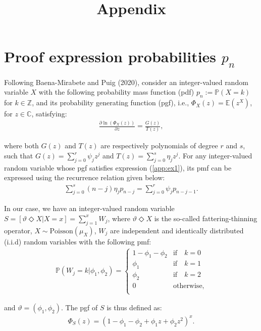 \documentclass{article}
\title{Appendix}
\date{}
\begin{document}
\maketitle

\section
{Proof expression probabilities $p_n$}

Following Baena-Mirabete and Puig (2020), consider an integer-valued random variable $X$ with the following probability mass function (pdf) $p_n:=\mathbb{P}(X=k)$ for $k \in \mathbb{Z}$, and its probability generating function (pgf), i.e., $\Phi_X(z)=\mathbb{E}(z^X)$, for $z\in \mathbb{C}$, satisfying:
\begin{align}\label{app:ex1}
\frac{\partial \ln(\Phi_X(z))}{\partial z}=\frac{G(z)}{T(z)},
\end{align}

where both $G(z)$ and $T(z)$ are respectively polynomials of degree $r$ and $s$, such that $G(z)=\sum_{j=0}^r \psi_j z^j$ and $T(z)=\sum_{j=0}^s \eta_j z^j$. For any integer-valued random variable whose pgf satisfies expression (\ref{app:ex1}), its pmf can be expressed using the recurrence relation given below:
\begin{align}\label{app:ex2}
\sum_{j=0}^s(n-j)\eta_jp_{n-j}=\sum_{j=0}^r \psi_j p_{n-j-1}.
\end{align}

In our case, we have an integer-valued random variable $S=[\vartheta\Diamond X|X=x]=\sum_{j=1}^xW_j$, where $\vartheta \Diamond X$ is the so-called fattering-thinning operator, $X \sim \textrm{Poisson}(\mu_X)$, $W_j$ are independent and identically distributed (i.i.d) random variables with the following pmf:
\begin{align}\label{app:ex3}
\mathbb{P}(W_j=k|\phi_1,\phi_2)=\begin{cases} 
1-\phi_1-\phi_2  & \textrm{if} \quad k=0 \\
\phi_1 & \textrm{if} \quad k=1 \\
\phi_2 & \textrm{if} \quad k=2  \\
0 & \textrm{otherwise} , \\
\end{cases}
\end{align}

and $\vartheta=(\phi_1,\phi_2)$. The pgf of $S$ is thus defined as:
\begin{align}\label{app:ex4}
\Phi_S(z)=\left(1-\phi_1-\phi_2+\phi_1z+\phi_2z^2\right)^{x}.
\end{align}
\end{document}
